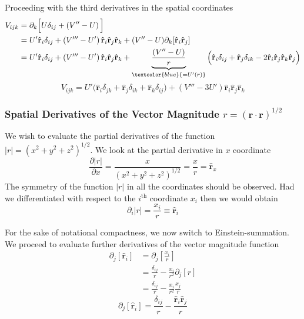 \documentclass[8pt,a4paper]{article}
\begin{document}
	Proceeding with the third derivatives in the spatial coordinates
	\begin{align}
		V_{ijk} &= \partial_k \Big[ U \delta_{ij} +\left(V'' - U\right) \Big] \\
		&= U'\mathbf{\hat{r}}_i \delta_{ij} + \left(V''' - U'\right) \mathbf{\hat{r}}_i \mathbf{\hat{r}}_j \mathbf{\hat{r}}_k + (V'' - U)\partial_k[\mathbf{\hat{r}}_i \mathbf{\hat{r}}_j] \\
		&= U'\mathbf{\hat{r}}_i \delta_{ij} + \left(V''' - U'\right) \mathbf{\hat{r}}_i \mathbf{\hat{r}}_j \mathbf{\hat{r}}_k + \underbrace{\frac{(V'' - U)}{r}}_{\textcolor{blue}{=U'(r)}}\Big(\mathbf{\hat{r}}_i \delta_{ij} + \mathbf{\hat{r}}_j \delta_{ik} - 2\mathbf{\hat{r}}_i \mathbf{\hat{r}}_j \mathbf{\hat{r}}_k \mathbf{\hat{r}}_j\Big) \\
	\end{align}
	\begin{equation}
		\boxed{V_{ijk} = U'\Big(\mathbf{\hat{r}}_i \delta_{jk} + \mathbf{\hat{r}}_j \delta_{ik} + \mathbf{\hat{r}}_k \delta_{ij} \Big) + (V''' - 3U')\mathbf{\hat{r}}_i \mathbf{\hat{r}}_j \mathbf{\hat{r}}_k}
	\end{equation}
	\subsubsection{Spatial Derivatives of the Vector Magnitude $r = (\mathbf{r}\cdot\mathbf{r})^{1/2}$}
	We wish to evaluate the partial derivatives of the function $|r| = (x^2 + y^2 + z^2)^{1/2}$. We look at the partial derivative in $x$ coordinate
	\begin{equation}
		\frac{\partial |r|}{\partial x} = \frac{x}{\left(x^2 + y^2 + z^2\right)^{1/2}} = \frac{x}{r} = \mathbf{\hat{r}}_x
	\end{equation}
	The symmetry of the function $|r|$ in all the coordinates should be observed. Had we differentiated with respect to the $i^\mathrm{th}$ coordinate $x_i$ then we would obtain
	\begin{equation}
		\boxed{\partial_i |r| = \frac{x_i}{r} \equiv \mathbf{\hat{r}}_i}
	\end{equation}
	
	For the sake of notational compactness, we now switch to Einstein-summation. We proceed to evaluate further derivatives of the vector magnitude function
	\begin{align}
		\partial_j\left[ \mathbf{\hat{r}}_i \right] &= \partial_j\left[\frac{x_i}{r}\right] \\
		&= \frac{\delta_{ij}}{r} - \frac{x_i}{r^2}\partial_j[r] \\
		&= \frac{\delta_{ij}}{r} - \frac{x_i}{r^2}\frac{x_j}{r}
	\end{align}
	\begin{equation}
		\boxed{\partial_j\left[ \mathbf{\hat{r}}_i \right] =  \frac{\delta_{ij}}{r} - \frac{\mathbf{\hat{r}}_i \mathbf{\hat{r}}_j}{r}}
	\end{equation}
	
\end{document}
